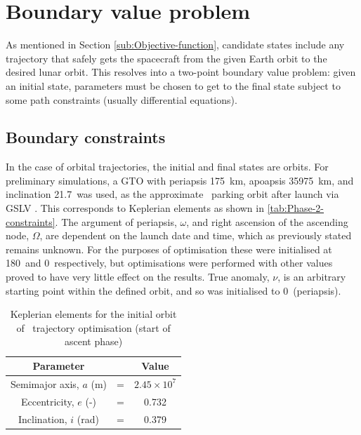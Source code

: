 \section{Boundary value problem} \label{sec:Boundary-value-problem}

As mentioned in Section \ref{sub:Objective-function}, candidate states include any trajectory that safely gets the spacecraft from the given Earth orbit to the desired lunar orbit. This resolves into a two-point boundary value problem: given an initial state, parameters must be chosen to get to the final state subject to some path constraints (usually differential equations).

\subsection{Boundary constraints} \label{sub:Boundary-constraints}

In the case of orbital trajectories, the initial and final states are orbits. For preliminary simulations, a GTO with periapsis 175~km, apoapsis 35975~km, and inclination 21.7\degrees\ was used, as the approximate \BW\ parking orbit after launch via GSLV \parencite{GSLV}. This corresponds to Keplerian elements as shown in \autoref{tab:Phase-2-constraints}. The argument of periapsis, $\omega$, and right ascension of the ascending node, $\Omega$, are dependent on the launch date and time, which as previously stated remains unknown. For the purposes of optimisation these were initialised at 180\degrees\ and 0\degrees\ respectively, but optimisations were performed with other values proved to have very little effect on the results. True anomaly, $\nu$, is an arbitrary starting point within the defined orbit, and so was initialised to 0\degrees\ (periapsis).

\begin{table}[h]
\caption{Keplerian elements for the initial orbit of \BW\ trajectory optimisation (start of ascent phase)}
\label{tab:Phase-2-constraints}
\begin{center}
\begin{tabular} {ccc}\toprule
Parameter & & Value\\\midrule
Semimajor axis, $a$ (m) &=& $2.45\times 10^7$\\
Eccentricity, $e$ (-) &=& 0.732\\
Inclination, $i$ (rad) &=& 0.379\\\bottomrule
\end{tabular}
\end{center}
\end{table}

